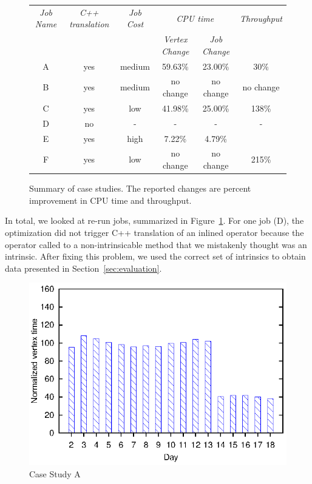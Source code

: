 \begin{figure}[ht]
\begin{tabular}{c|c|c|c|c|c} 
\toprule
  {\em Job Name} & {\em C++ translation}&{\em Job Cost} & \multicolumn{2}{c}{\em CPU time} &  {\em Throughput } \\
  \cmidrule{4-5}  
  & & & {\em Vertex Change} & {\em Job Change} &  \\
  \midrule

A & yes & medium & 59.63\%  & 23.00\% & 30\%\\
B &yes & medium & no change & no change & no change\\
C & yes & low    & 41.98\%  & 25.00\% & 138\% \\
D & no & - & - & - & -\\
E & yes & high   & 7.22\%   & 4.79\% & \todo{} \\
F & yes & low & no change & no change & 215\%\\

\end{tabular}
\caption{Summary of case studies. The reported changes are percent improvement in CPU time and throughput. \label{fig:caseStudySummary}}
\end{figure}

In total, we looked at \casestudyjobs{} re-run jobs, summarized in Figure~\ref{fig:caseStudySummary}. 
For one job (D), the optimization did not trigger C++ translation of an inlined operator because the operator called to a non-intrinsicable method that we mistakenly thought was an intrinsic.
After fixing this problem, we used the correct set of intrinsics to obtain data presented in Section~\ref{sec:evaluation}.
\begin{figure}[ht]
\includegraphics{graphs/normalizedTimesA}
\caption{Case Study A \label{fig:CaseStudyA}}
\end{figure}

